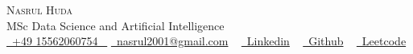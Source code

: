 \begin{center}
    {\Huge \scshape Nasrul Huda} \\ \vspace{1pt}
   MSc Data Science and Artificial Intelligence \\ \vspace{4pt}
    \small \href{tel:+917289968427}{\faMobile*\ +49 15562060754 ~} \href{mailto:nasrul2001@gmail.com}{\faEnvelope\  nasrul2001@gmail.com} ~ 
    \href{https://www.linkedin.com/in/nasrul-hudaa/}{\faLinkedin\ Linkedin}  ~
    \href{https://github.com/nnasrull}{\faGithub\ Github} ~
    \href{https://leetcode.com/u/nnassrull/}{\faLink\ Leetcode}  ~
\end{center}
